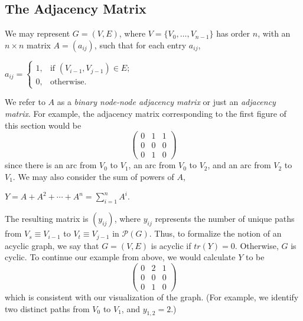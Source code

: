 \documentclass[12pt,twoside]{reedthesis}
\begin{document}
	\subsection*{The Adjacency Matrix}
	We may represent $G=(V,E)$, where $V = \{V_0, \ldots, V_{n-1} \}$ has order $n$, with an $n \times n$ matrix $A = (a_{ij})$, such that for each entry $a_{ij}$, 
	\begin{center}
	 	$a_{ij} = 
		\begin{cases} 1, & \textrm{if\ \ \ } (V_{i-1},V_{j-1}) \in E; \\
		0, & \textrm{otherwise}. \end{cases}$
	 \end {center}
	We refer to $A$ as a {\em binary node-node adjacency matrix} or just an {\em adjacency matrix}. For example, the adjacency matrix corresponding to the first figure of this section would be
	\[
	\begin{pmatrix}
	0 & 1 & 1 \\
	0 & 0 & 0 \\
	0 & 1 & 0
	\end{pmatrix} \]
	since there is an arc from $V_0$ to $V_1$, an arc from $V_0$ to $V_2$, and an arc from $V_2$ to $V_1$. We may also consider the sum of powers of $A$,
	\begin{center}
		$Y = A + A^2 + \cdots + A^n = \displaystyle\sum_{i=1}^{n} A^{i}$.
	\end{center}
	The resulting matrix is $(y_{ij})$, where $y_{ij}$ represents the number of unique paths from $V_s \equiv V_{i-1}$ to $V_t \equiv V_{j-1}$ in $\mathcal P(G)$. 
	Thus, to formalize the notion of an acyclic graph, we say that $G=(V,E)$ is acyclic if $tr(Y) = 0$. 
	Otherwise, $G$ is cyclic.
	To continue our example from above, we would calculate $Y$ to be
	\[
	\begin{pmatrix}
	0 & 2 & 1 \\
	0 & 0 & 0 \\
	0 & 1 & 0
	\end{pmatrix} \]
	which is consistent with our visualization of the graph. 
	(For example, we identify two distinct paths from $V_0$ to $V_1$, and $y_{1,2} = 2$.)
	
\end{document}
